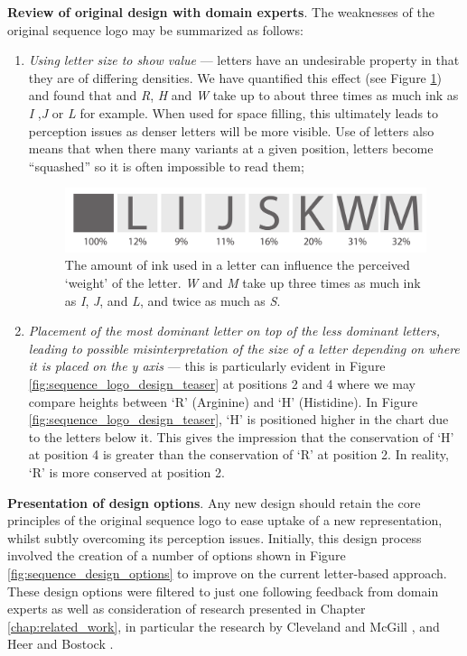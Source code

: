 \textbf{Review of original design with domain experts}. The weaknesses of the original sequence logo may be summarized as follows: 
\begin{enumerate}
\item \emph{Using letter size to show value} --- letters have an undesirable property in that they are of differing densities. We have quantified this effect (see Figure \ref{fig:letter-area}) and found that and \emph{R}, \emph{H} and \emph{W} take up to about three times as much ink as \emph{I} ,\emph{J} or \emph{L} for example.
When used for space filling, this ultimately leads to perception issues as denser letters will be more visible.
Use of letters also means that when there many variants at a given position, letters become ``squashed'' so it is often impossible to read them;

\begin{figure}[b!]
\centering
\includegraphics[width=.6\textwidth]{images/other_glyphs/sequence_logo/space}
\caption{The amount of ink used in a letter can influence the perceived `weight' of the letter. \emph{W} and \emph{M} take up three times as much ink as \emph{I}, \emph{J}, and \emph{L}, and twice as much as \emph{S}.}
\label{fig:letter-area}
\end{figure}

\item \emph{Placement of the most dominant letter on top of the less dominant letters, leading to possible misinterpretation of the size of a letter depending on where it is placed on the y axis} --- this is particularly evident in Figure \ref{fig:sequence_logo_design_teaser} at positions 2 and 4 where we may compare heights between `R' (Arginine) and `H' (Histidine).
In Figure \ref{fig:sequence_logo_design_teaser}, `H' is positioned higher in the chart due to the letters below it.
This gives the impression that the conservation of `H' at position 4 is greater than the conservation of `R' at position 2. In reality, `R' is more conserved at position 2.
\end{enumerate}

\textbf{Presentation of design options}. Any new design should retain the core principles of the original sequence logo to ease uptake of a new representation, whilst subtly overcoming its perception issues.
Initially, this design process involved the creation of a number of options shown in Figure \ref{fig:sequence_design_options} to improve on the current letter-based approach. 
These design options were filtered to just one following feedback from domain experts as well as consideration of research presented in Chapter \ref{chap:related_work}, in particular the research by Cleveland and McGill \cite{cleveland1984graphical}, and Heer and Bostock \cite{heer2010crowdsourcing}.

